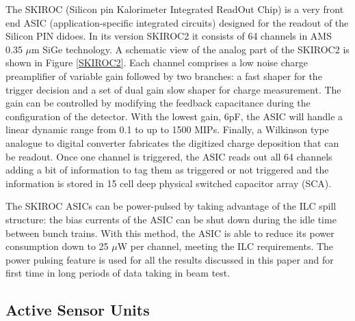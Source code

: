 \documentclass[a4paper,11pt]{article}
\begin{document}
The SKIROC\cite{Callier:2011zz} (Silicon pin Kalorimeter Integrated ReadOut Chip) is a
very front end ASIC (application-specific integrated circuits)
designed for the readout of the Silicon PIN didoes.
In its version SKIROC2 it consists of 64 channels in AMS 0.35 $\mu$m SiGe technology.
A schematic view of the analog part of the SKIROC2 is shown in Figure \ref{SKIROC2}.
Each channel comprises a low noise charge preamplifier of variable gain followed by two branches:
a fast shaper for the trigger decision and a set of dual gain slow shaper for charge measurement. 
The gain can be controlled by modifying the feedback capacitance during the configuration of the detector.
With the lowest gain, 6pF, the ASIC will handle a linear dynamic range from 0.1 to up to 1500 MIPs. 
Finally, a Wilkinson type analogue to digital converter fabricates the digitized charge deposition that can be readout. 
Once one channel is triggered, the ASIC reads out all 64 channels adding a bit of information to tag them as
triggered or not triggered and the information is stored in 15 cell deep physical switched capacitor array (SCA).

The SKIROC ASICs can be power-pulsed by taking advantage of the ILC spill structure: 
the bias currents of the ASIC can be shut down during the idle time between bunch trains.
With this method, the ASIC is able to reduce its power consumption down to 25 $\mu$W per channel,
meeting the ILC requirements. 
The power pulsing feature is used for all the results discussed in this paper
and for first time in long periods of data taking in beam test.



\subsection{Active Sensor Units}
\label{sec:ASU}
\end{document}

